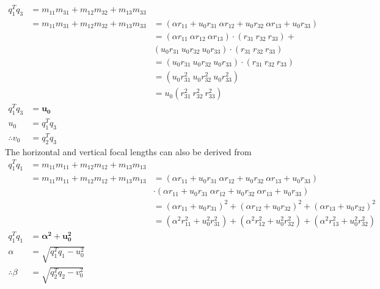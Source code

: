 \documentclass[12pt]{report}
\begin{document}
\begin{enumerate}
\begin{enumerate}
    \setlength{\mathindent}{0pt}
    \begin{align*}
    q_1^T q_3 & = m_{11}m_{31} + m_{12}m_{32} + m_{13}m_{33} & \\
    & = m_{11}m_{31} + m_{12}m_{32} + m_{13}m_{33} &= (\alpha r_{11} + u_0 r_{31} \  \alpha r_{12} + u_0 r_{32} \  \alpha r_{13} + u_0 r_{33}) \\
    && = (\alpha r_{11} \ \alpha r_{12} \ \alpha r_{13})\cdot(r_{31}  \ r_{32}  \ r_{33}) +  \\ 
    && (u_0 r_{31}  \ u_0 r_{32} \ u_0 r_{33})\cdot(r_{31}  \ r_{32}  \ r_{33}) \\
    && = (u_0 r_{31}  \ u_0 r_{32} \ u_0 r_{33})\cdot(r_{31}  \ r_{32}  \ r_{33}) \\
    && = (u_0 r_{31}^2  \ u_0 r_{32}^2 \ u_0 r_{33}^2) \\
    && = u_0 (r_{31}^2  \ r_{32}^2 \ r_{33}^2) \\
    q_1^T q_3 & = \mathbf{u_0} \\
    u_0 & = q_1^T q_3 \\
    \therefore v_0 & = q_2^T q_3
    \end{align*}
    The horizontal and vertical focal lengths can also be derived from 
    \begin{align*}
    q_1^T q_1 & = m_{11}m_{11} + m_{12}m_{12} + m_{13}m_{13} & {}  \\
    & = m_{11}m_{11} + m_{12}m_{12} + m_{13}m_{13} &= (\alpha r_{11} + u_0 r_{31} \  \alpha r_{12} + u_0 r_{32} \  \alpha r_{13} + u_0 r_{33}) & {} \\
    & {} & \cdot  (\alpha r_{11} + u_0 r_{31} \  \alpha r_{12} + u_0 r_{32} \  \alpha r_{13} + u_0 r_{33})  & {}  \\
    & {} & = (\alpha r_{11} + u_0 r_{31})^2 + (\alpha r_{12} + u_0 r_{32})^2 + (\alpha r_{13} + u_0 r_{32})^2  & {}  \\
    & {} & = (\alpha^2 r_{11}^2 + u_0^2 r_{31}^2) + (\alpha^2 r_{12}^2 + u_0^2 r_{32}^2) + (\alpha^2 r_{13}^2 + u_0^2 r_{32}^2) & {} \\
    q_1^T q_1 & = \mathbf{\alpha^2 + u_0^2} \\
    \alpha & = \sqrt{q_1^T q_1 - u_0^2} \\
    \therefore \beta & = \sqrt{q_2^T q_2 - v_0^2} 
    \end{align*}


\end{enumerate}
\end{enumerate}
\end{document}
